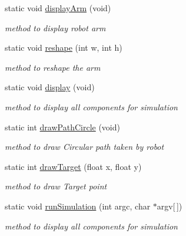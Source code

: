 \begin{DoxyCompactItemize}
\item 
static void \hyperlink{classRobotsimulator_a94348f09e5ce52444d4f0f526e723bc5}{display\+Arm} (void)
\begin{DoxyCompactList}\small\item\em method to display robot arm \end{DoxyCompactList}\item 
static void \hyperlink{classRobotsimulator_a24d1290882d5bac99e860fcf822fdc44}{reshape} (int w, int h)
\begin{DoxyCompactList}\small\item\em method to reshape the arm \end{DoxyCompactList}\item 
static void \hyperlink{classRobotsimulator_a9b1a52a2863af168184ab996858a764c}{display} (void)
\begin{DoxyCompactList}\small\item\em method to display all components for simulation \end{DoxyCompactList}\item 
static int \hyperlink{classRobotsimulator_aef4f47da29aede919802a5cc6e67fadb}{draw\+Path\+Circle} (void)
\begin{DoxyCompactList}\small\item\em method to draw Circular path taken by robot \end{DoxyCompactList}\item 
static int \hyperlink{classRobotsimulator_ab3f7118a0c8ee44dfc0e4d672e017b79}{draw\+Target} (float x, float y)
\begin{DoxyCompactList}\small\item\em method to draw Target point \end{DoxyCompactList}\item 
static void \hyperlink{classRobotsimulator_a96d2a360625f5b96b08ca0f8031c99f9}{run\+Simulation} (int argc, char $\ast$argv\mbox{[}$\,$\mbox{]})
\begin{DoxyCompactList}\small\item\em method to display all components for simulation \end{DoxyCompactList}\end{DoxyCompactItemize}
